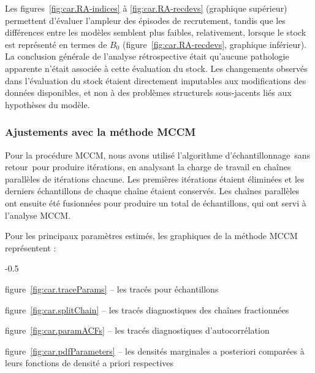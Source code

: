 \documentclass[11pt]{book}
\newcommand{\angL}{\guillemotleft\,}
\newcommand{\angR}{\,\guillemotright}
\begin{document}
Les figures~\ref{fig:car.RA-indices} \`{a} \ref{fig:car.RA-recdevs} (graphique sup\'{e}rieur) permettent d'\'{e}valuer l'ampleur des \'{e}pisodes de recrutement, tandis que les diff\'{e}rences entre les mod\`{e}les semblent plus faibles, relativement, lorsque le stock est repr\'{e}sent\'{e} en termes de $B_0$ (figure~\ref{fig:car.RA-recdevs}, graphique inf\'{e}rieur).
La conclusion g\'{e}n\'{e}rale de l'analyse r\'{e}trospective \'{e}tait qu'aucune pathologie apparente n'\'{e}tait associ\'{e}e \`{a} cette \'{e}valuation du stock. Les changements observ\'{e}s dans l'\'{e}valuation du stock \'{e}taient directement imputables aux modifications des donn\'{e}es disponibles, et non \`{a} des probl\`{e}mes structurels sous-jacents li\'{e}s aux hypoth\`{e}ses du mod\`{e}le.


\graphicspath{{C:/Users/haighr/Files/GFish/PSARC/PSARC_2020s/PSARC22/CAR/Data/SS/CAR2022/Run24/MPD.24.01/french/}}
\clearpage

\subsubsection{Ajustements avec la m\'{e}thode MCCM}\label{sssMCMC}


Pour la proc\'{e}dure MCCM, nous avons utilis\'{e} l'algorithme d'\'{e}chantillonnage \angL{}sans retour\angR{}  \citep{Monnahan-Kristensen:2018, Monnahan-etal:2019} pour produire \nSimsBase{} it\'{e}rations, en analysant la charge de travail en \nChains{} cha\^{i}nes parall\`{e}les \citep{R:2015_snowfall} de \cSimsBase{} it\'{e}rations chacune. Les \cBurnBase{} premi\`{e}res it\'{e}rations \'{e}taient \'{e}limin\'{e}es et les \cSamps{} derniers \'{e}chantillons de chaque cha\^{i}ne \'{e}taient conserv\'{e}s.
Les cha\^{i}nes parall\`{e}les ont ensuite \'{e}t\'{e} fusionn\'{e}es pour produire un total de \Nmcmc{} \'{e}chantillons, qui ont servi \`{a} l'analyse MCCM.

Pour les principaux param\`{e}tres estim\'{e}s, les graphiques de la m\'{e}thode MCCM repr\'{e}sentent :
\begin{itemize_csas}{-0.5}{}
\item figure~\ref{fig:car.traceParams} -- les trac\'{e}s pour \Nmcmc{} \'{e}chantillons
\item figure~\ref{fig:car.splitChain} -- les trac\'{e}s diagnostiques des cha\^{i}nes fractionn\'{e}es
\item figure~\ref{fig:car.paramACFs} -- les trac\'{e}s diagnostiques d'autocorr\'{e}lation
\item figure~\ref{fig:car.pdfParameters} -- les densit\'{e}s marginales a posteriori compar\'{e}es \`{a} leurs fonctions de densit\'{e} a priori respectives
\end{itemize_csas}
\end{document}
